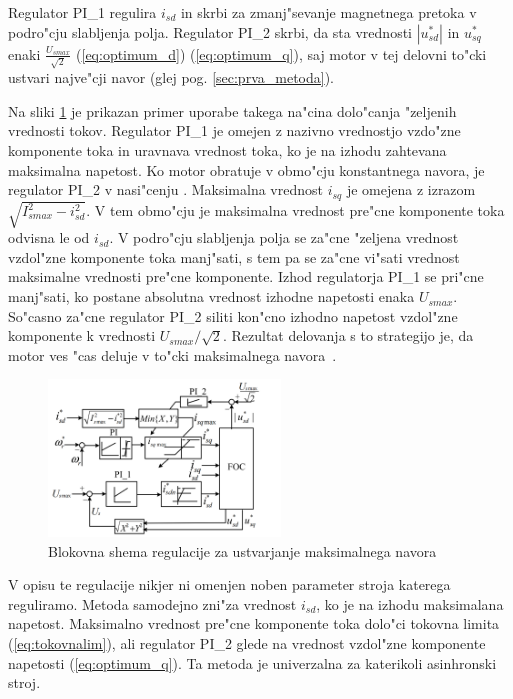 \documentclass[journal,a4paper,twoside]{sty/IEEEtran}
\begin{document}
Regulator PI\_1 regulira $i_{sd}$ in skrbi za zmanj"sevanje magnetnega pretoka v podro"cju slabljenja polja. Regulator PI\_2 skrbi, da sta vrednosti $|u_{sd}^*|$ in $u_{sq}^*$ enaki $\frac{U_{smax}}{\sqrt{2}}$ (\ref{eq:optimum_d}) (\ref{eq:optimum_q}), saj motor v tej delovni to"cki ustvari najve"cji navor (glej pog. \ref{sec:prva_metoda}).

Na sliki \ref{fig:MTPA_app} je prikazan primer uporabe takega na"cina dolo"canja "zeljenih vrednosti tokov. Regulator PI\_1 je omejen z nazivno vrednostjo vzdo"zne komponente toka in uravnava vrednost toka, ko je na izhodu zahtevana maksimalna napetost. Ko motor obratuje v obmo"cju konstantnega navora, je regulator PI\_2 v nasi"cenju . Maksimalna vrednost $i_{sq}$ je omejena z izrazom $\sqrt{I_{smax}^2-i_{sd}^2}$. V tem obmo"cju je maksimalna vrednost pre"cne komponente toka odvisna le od $i_{sd}$. V podro"cju slabljenja polja se za"cne "zeljena vrednost vzdol"zne komponente toka manj"sati, s tem pa se za"cne vi"sati vrednost maksimalne vrednosti pre"cne komponente. Izhod regulatorja PI\_1 se pri"cne manj"sati, ko postane absolutna vrednost izhodne napetosti enaka $U_{smax}$. So"casno za"cne regulator PI\_2 siliti kon"cno izhodno napetost vzdol"zne komponente k vrednosti $U_{smax}/\sqrt{2}$. Rezultat delovanja s to strategijo je, da motor ves "cas deluje v to"cki maksimalnega navora~\cite{MTPA}.



\begin{figure}
\includegraphics[width=0.55\textwidth]{MTPA.png}

\caption{Blokovna shema regulacije za ustvarjanje maksimalnega navora \cite{MTPA}}
\label{fig:MTPA_app}
\end{figure}

V opisu te regulacije nikjer ni omenjen noben parameter stroja katerega reguliramo. Metoda samodejno zni"za vrednost $i_{sd}$, ko je na izhodu maksimalana napetost. Maksimalno vrednost pre"cne komponente toka dolo"ci tokovna limita (\ref{eq:tokovnalim}), ali regulator PI\_2 glede na vrednost vzdol"zne komponente napetosti (\ref{eq:optimum_q}). Ta metoda je univerzalna za katerikoli asinhronski stroj.
\end{document}
